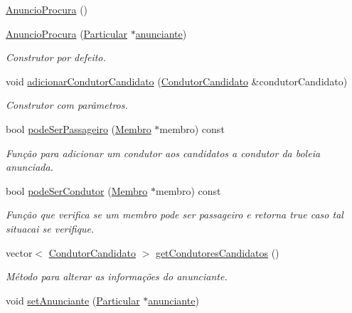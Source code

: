 \begin{DoxyCompactItemize}
\item 
\hyperlink{class_anuncio_procura_af0d631aecbb747fb64ad8a80f50944b0}{Anuncio\+Procura} ()
\item 
\hyperlink{class_anuncio_procura_a03743cdc7492d168d554b8dcd56982aa}{Anuncio\+Procura} (\hyperlink{class_particular}{Particular} $\ast$\hyperlink{class_anuncio_a58250bfc8ab82d4308839b1e26213a0f}{anunciante})
\begin{DoxyCompactList}\small\item\em Construtor por defeito. \end{DoxyCompactList}\item 
void \hyperlink{class_anuncio_procura_a13d30275e62d58a007baed6d53635a22}{adicionar\+Condutor\+Candidato} (\hyperlink{struct_condutor_candidato}{Condutor\+Candidato} \&condutor\+Candidato)
\begin{DoxyCompactList}\small\item\em Construtor com parâmetros. \end{DoxyCompactList}\item 
bool \hyperlink{class_anuncio_procura_aab615cb1457ec3784d55149d44cdc458}{pode\+Ser\+Passageiro} (\hyperlink{class_membro}{Membro} $\ast$membro) const 
\begin{DoxyCompactList}\small\item\em Função para adicionar um condutor aos candidatos a condutor da boleia anunciada. \end{DoxyCompactList}\item 
bool \hyperlink{class_anuncio_procura_aa7689f1ae7175e99b144c48422231e17}{pode\+Ser\+Condutor} (\hyperlink{class_membro}{Membro} $\ast$membro) const 
\begin{DoxyCompactList}\small\item\em Função que verifica se um membro pode ser passageiro e retorna true caso tal situacai se verifique. \end{DoxyCompactList}\item 
vector$<$ \hyperlink{struct_condutor_candidato}{Condutor\+Candidato} $>$ \hyperlink{class_anuncio_procura_a5ceb65dc092e5fd576dbc5db90ef6187}{get\+Condutores\+Candidatos} ()
\begin{DoxyCompactList}\small\item\em Método para alterar as informações do anunciante. \end{DoxyCompactList}\item 
void \hyperlink{class_anuncio_procura_a303be648c388693e6b92e6bf467c06ff}{set\+Anunciante} (\hyperlink{class_particular}{Particular} $\ast$\hyperlink{class_anuncio_a58250bfc8ab82d4308839b1e26213a0f}{anunciante})

\end{DoxyCompactItemize}
